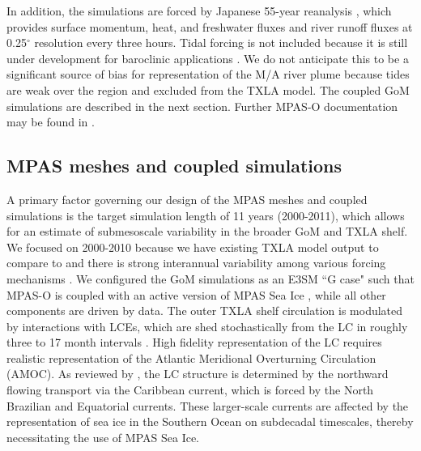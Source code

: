 In addition, the simulations are forced by Japanese 55-year reanalysis \citep[JRA-55, ][]{kobayashi2015jra}, which provides surface momentum, heat, and freshwater fluxes and river runoff fluxes at 0.25$^\circ$ resolution every three hours. Tidal forcing is not included because it is still under development for baroclinic applications \citep{barton2022global}. We do not anticipate this to be a significant source of bias for representation of the M/A river plume because tides are weak over the region \citep{DiMarco_1998} and excluded from the TXLA model. The coupled GoM simulations are described in the next section. Further MPAS-O documentation may be found in \cite{petersen2018mpas}.

\subsection{MPAS meshes and coupled simulations}
A primary factor governing our design of the MPAS meshes and coupled simulations is the target simulation length of 11 years (2000-2011), which allows for an estimate of submesoscale variability in the broader GoM and TXLA shelf. We focused on 2000-2010 because we have existing TXLA model output to compare to and there is strong interannual variability among various forcing mechanisms \citep[see Tab. 2 of ][]{forrest2011multivariable}. We configured the GoM simulations as an E3SM ``G case" such that MPAS-O is coupled with an active version of MPAS Sea Ice \citep{petersen2019evaluation, turner2022mpas}, while all other components are driven by data. The outer TXLA shelf circulation is modulated by interactions with LCEs, which are shed stochastically from the LC in roughly three to 17 month intervals \citep{oey2005loop}. High fidelity representation of the LC requires realistic representation of the Atlantic Meridional Overturning Circulation (AMOC). As reviewed by \cite{richardson2005caribbean}, the LC structure is determined by the northward flowing transport via the Caribbean current, which is forced by the North Brazilian and Equatorial currents. These larger-scale currents are affected by the representation of sea ice in the Southern Ocean on subdecadal timescales, thereby necessitating the use of MPAS Sea Ice.

